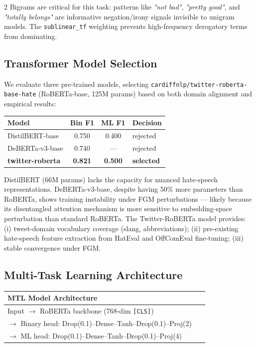 \documentclass[11pt]{article}
\begin{document}
\begin{multicols}{2}
Bigrams are critical for this task: patterns like \textit{"not bad"}, \textit{"pretty good"}, and \textit{"totally belongs"} are informative negation/irony signals invisible to unigram models. The \texttt{sublinear\_tf} weighting prevents high-frequency derogatory terms from dominating.

\subsection{Transformer Model Selection}

We evaluate three pre-trained models, selecting \texttt{cardiffnlp/}\allowbreak\texttt{twitter-roberta-base-hate} (RoBERTa-base, 125M params) based on both domain alignment and empirical results:

\begin{center}
\small
\begin{tabular}{lccl}
\toprule
\textbf{Model} & \textbf{Bin F1} & \textbf{ML F1} & \textbf{Decision} \\
\midrule
DistilBERT-base & 0.750 & 0.400 & rejected \\
DeBERTa-v3-base & 0.740 & — & rejected \\
\textbf{twitter-roberta} & \textbf{0.821} & \textbf{0.500} & \textbf{selected} \\
\bottomrule
\end{tabular}
\end{center}

DistilBERT (66M params) lacks the capacity for nuanced hate-speech representations. DeBERTa-v3-base, despite having 50\% more parameters than RoBERTa, shows training instability under FGM perturbations — likely because its disentangled attention mechanism is more sensitive to embedding-space perturbation than standard RoBERTa. The Twitter-RoBERTa model provides: (i) tweet-domain vocabulary coverage (slang, abbreviations); (ii) pre-existing hate-speech feature extraction from HatEval and OffComEval fine-tuning; (iii) stable convergence under FGM.

\subsection{Multi-Task Learning Architecture}

\begin{center}
\small
\begin{tabular}{p{0.95\linewidth}}
\toprule
\textbf{MTL Model Architecture} \\
\midrule
Input $\rightarrow$ RoBERTa backbone (768-dim \texttt{[CLS]}) \\
\quad$\rightarrow$ Binary head: Drop(0.1)–Dense–Tanh–Drop(0.1)–Proj(2) \\
\quad$\rightarrow$ ML head:\phantom{n} Drop(0.1)–Dense–Tanh–Drop(0.1)–Proj(4) \\
\bottomrule
\end{tabular}
\end{center}


\end{multicols}
\end{document}
